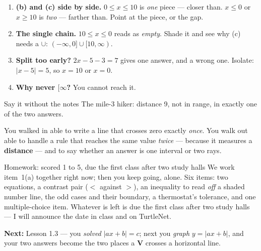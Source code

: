 \documentclass[aspectratio=169, 11pt]{beamer}
\begin{document}
\begin{frame}[t, plain]
  \begin{enumerate}\setlength{\itemsep}{5pt}
    \item \textbf{(b) and (c) side by side.} $0\le x\le10$ is \emph{one} piece --- closer than.
          $x\le0$ or $x\ge10$ is \emph{two} --- farther than. Point at the piece, or the gap.
    \item \textbf{The single chain.} $10\le x\le0$ reads as \emph{empty}. Shade it and see why
          (c) needs a $\cup$: $(-\infty,0]\cup[10,\infty)$.
    \item \textbf{Split too early?} $2x-5-3=7$ gives one answer, and a wrong one. Isolate:
          $|x-5|=5$, so $x=10$ or $x=0$.
    \item \textbf{Why never $[\infty$?} You cannot reach it.
  \end{enumerate}
  \vspace{4pt}
  \begin{block}{Say it without the notes}
    The mile-3 hiker: distance 9, not in range, in exactly one of the two answers.
  \end{block}
\end{frame}

\begin{frame}[t, plain]
  You walked in able to write a line that crosses zero exactly \emph{once}. You walk out able to
  handle a rule that reaches the same value \emph{twice} --- because it measures a \textbf{distance}
  --- and to say whether an answer is one interval or two rays.
  \vspace{5pt}
  \begin{block}{Homework: scored 1 to 5, due the first class after two study halls}
    We work item~1(a) together right now; then you keep going, alone. Six items: two equations,
    a contrast pair ($<$ against $>$), an inequality to read \emph{off} a shaded number line, the
    odd cases and their boundary, a thermostat's tolerance, and one multiple-choice item. Whatever is left is
    due the first class after two study halls --- I will announce the date in class and on TurtleNet.
  \end{block}
  \vspace{4pt}
  \textbf{Next:} Lesson 1.3 --- you \emph{solved} $|ax+b|=c$; next you \emph{graph} $y=|ax+b|$, and
  your two answers become the two places a \textbf{V} crosses a horizontal line.
\end{frame}
\end{document}
